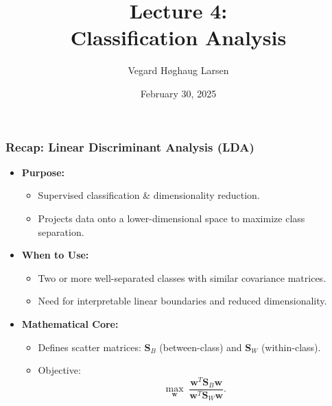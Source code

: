 \documentclass[aspectratio=169]{beamer}
\title{Lecture 4:\\ Classification Analysis}
\institute{GRA4160: Predictive Modelling with Machine Learning}
\date{February 30, 2025}
\author{Vegard H\o ghaug Larsen}
\begin{document}
\maketitle


\begin{frame}
    \frametitle{Recap: Linear Discriminant Analysis (LDA)}
    \begin{itemize}
        \item \textbf{Purpose:}
            \begin{itemize}
                \item Supervised classification \& dimensionality reduction.
                \item Projects data onto a lower-dimensional space to maximize class separation.
            \end{itemize}
        \item \textbf{When to Use:}
            \begin{itemize}
                \item Two or more well-separated classes with similar covariance matrices.
                \item Need for interpretable linear boundaries and reduced dimensionality.
            \end{itemize}
        \item \textbf{Mathematical Core:}
            \begin{itemize}
                \item Defines scatter matrices: \(\mathbf{S}_B\) (between-class) and \(\mathbf{S}_W\) (within-class).
                \item Objective: 
                \[
                    \max_{\mathbf{w}} \; \frac{\mathbf{w}^T \mathbf{S}_B \mathbf{w}}{\mathbf{w}^T \mathbf{S}_W \mathbf{w}}.
                \]
            \end{itemize}
    \end{itemize}
\end{frame}
\end{document}
